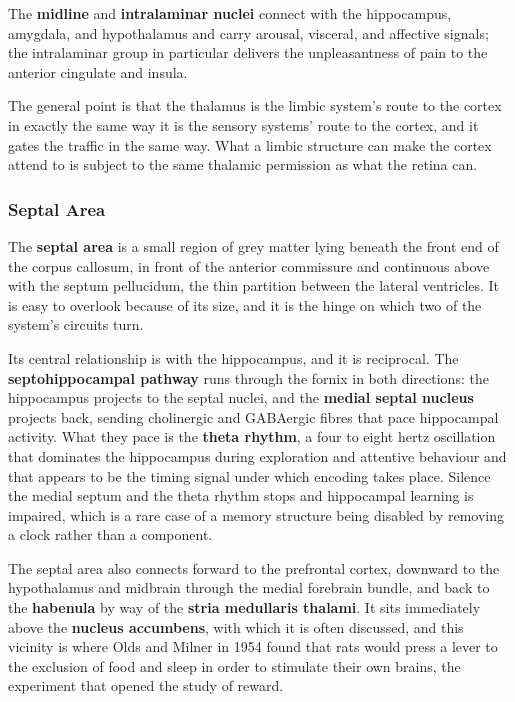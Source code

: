 \documentclass[11pt]{article}
\begin{document}
The \textbf{midline} and \textbf{intralaminar nuclei} connect with the hippocampus, amygdala, and hypothalamus and carry arousal, visceral, and affective signals; the intralaminar group in particular delivers the unpleasantness of pain to the anterior cingulate and insula.

The general point is that the thalamus is the limbic system's route to the cortex in exactly the same way it is the sensory systems' route to the cortex, and it gates the traffic in the same way. What a limbic structure can make the cortex attend to is subject to the same thalamic permission as what the retina can.

\subsubsection{Septal Area}

The \textbf{septal area} is a small region of grey matter lying beneath the front end of the corpus callosum, in front of the anterior commissure and continuous above with the septum pellucidum, the thin partition between the lateral ventricles. It is easy to overlook because of its size, and it is the hinge on which two of the system's circuits turn.

Its central relationship is with the hippocampus, and it is reciprocal. The \textbf{septohippocampal pathway} runs through the fornix in both directions: the hippocampus projects to the septal nuclei, and the \textbf{medial septal nucleus} projects back, sending cholinergic and GABAergic fibres that pace hippocampal activity. What they pace is the \textbf{theta rhythm}, a four to eight hertz oscillation that dominates the hippocampus during exploration and attentive behaviour and that appears to be the timing signal under which encoding takes place. Silence the medial septum and the theta rhythm stops and hippocampal learning is impaired, which is a rare case of a memory structure being disabled by removing a clock rather than a component.

The septal area also connects forward to the prefrontal cortex, downward to the hypothalamus and midbrain through the medial forebrain bundle, and back to the \textbf{habenula} by way of the \textbf{stria medullaris thalami}. It sits immediately above the \textbf{nucleus accumbens}, with which it is often discussed, and this vicinity is where Olds and Milner in 1954 found that rats would press a lever to the exclusion of food and sleep in order to stimulate their own brains, the experiment that opened the study of reward.
\end{document}
